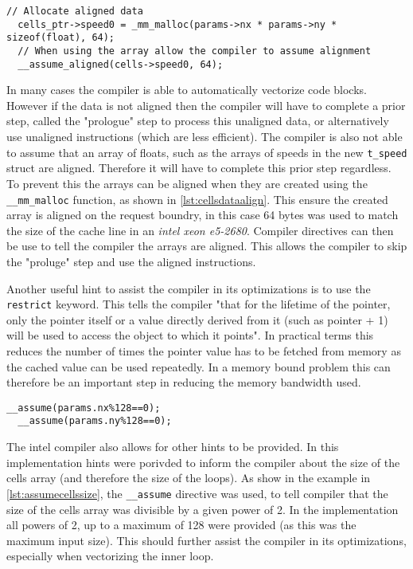 \documentclass{article}
\begin{document}
\begin{multicols}{2}
\begin{lstlisting}[style=CStyle, label={lst:cellsdataalign}, caption={Example of memory allignment for a cells array.},]
  // Allocate aligned data
  cells_ptr->speed0 = _mm_malloc(params->nx * params->ny * sizeof(float), 64);
  // When using the array allow the compiler to assume alignment
  __assume_aligned(cells->speed0, 64);
\end{lstlisting}

In many cases the compiler is able to automatically vectorize code blocks.
However if the data is not aligned then the compiler will have to complete a prior
step, called the "prologue" step to process this unaligned data, or
alternatively use unaligned instructions (which are less efficient). The
compiler is also not able to assume that an array of floats, such as the arrays
of speeds in the new \verb|t_speed| struct are aligned. Therefore it will have
to complete this prior step regardless. To prevent this the arrays can be
aligned when they are created using the \verb|__mm_malloc| function, as shown in \autoref{lst:cellsdataalign}. This
ensure the created array is aligned on the request boundry, in this case 64
bytes was used to match the size of the cache line in an \emph{intel xeon
e5-2680}. Compiler directives can then be use to tell the compiler the arrays
are aligned. This allows the compiler to skip the "proluge" step and use the
aligned instructions.


Another useful hint to assist the compiler in its optimizations is to use the
\verb|restrict| keyword. This tells the compiler "that for the lifetime of the
pointer, only the pointer itself or a value directly derived from it (such as
pointer + 1) will be used to access the object to which it points". In
practical terms this reduces the number of times the pointer value has to be
fetched from memory as the cached value can be used repeatedly. In a memory
bound problem this can therefore be an important step in reducing the memory
bandwidth used.

\begin{lstlisting}[style=CStyle, label={lst:assumecellssize}, caption={Additional compiler hints},]
  __assume(params.nx%128==0);
  __assume(params.ny%128==0);
\end{lstlisting}

The intel compiler also allows for other hints to be provided. In this
implementation hints were porivded to inform the compiler about the size of the
cells array (and therefore the size of the loops). As show in the example in
\autoref{lst:assumecellssize}, the \verb|__assume| directive was used, to tell
compiler that the size of the cells array was divisible by a given power of 2.
In the implementation all powers of 2, up to a maximum of 128 were provided (as
this was the maximum input size). This should further assist the compiler in
its optimizations, especially when vectorizing the inner loop.


\end{multicols}
\end{document}
